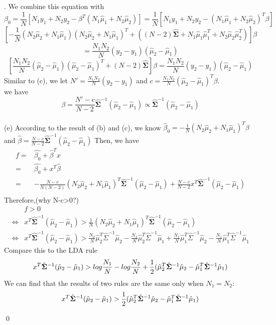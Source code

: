 \documentclass[12pt]{article}
\newenvironment{sol}
  {\par\vspace{3mm}\noindent{\it Solution}.}
  {\qed}
\begin{document}
\begin{sol}
We combine this equation with
$$\beta_0=\frac{1}{N}[N_1y_1+N_2y_2-\beta^T(N_1\hat{\mu}_1+N_2\hat{\mu}_2)]=\frac{1}{N}[N_1y_1+N_2y_2-(N_1\hat{\mu}_1+N_2\hat{\mu}_2)^T\beta]$$
$$\left[-\frac{1}{N}(N_2\hat{\mu}_2+N_1\hat{\mu}_1)(N_2\hat{\mu}_2+N_1\hat{\mu}_1)^T+((N-2)\hat{\mathbf{\Sigma}}+N_1\hat{\mu}_1\hat{\mu}_1^T+N_2\hat{\mu}_2\hat{\mu}_2^T)\right]\beta$$
$$=\frac{N_1N_2}{N}(y_2-y_1)(\hat{\mu}_2-\hat{\mu}_1)$$
$$\left[\frac{N_1N_2}{N}(\hat{\mu}_2-\hat{\mu}_1)(\hat{\mu}_2-\hat{\mu}_1)^T+(N-2)\hat{\mathbf{\Sigma}}\right]\beta=\frac{N_1N_2}{N}(y_2-y_1)(\hat{\mu}_2-\hat{\mu}_1)$$
Similar to (c), we let $N'=\frac{N_1N_2}{N}(y_2-y_1)$ and $c=\frac{N_1N_2}{N}(\hat{\mu}_2-\hat{\mu}_1)^T\beta$.\\
we have
$$\beta=\frac{N'-c}{N-2}\hat{\mathbf{\Sigma}}^{-1}(\hat{\mu}_2-\hat{\mu}_1)\propto\hat{\mathbf{\Sigma}}^{-1}(\hat{\mu}_2-\hat{\mu}_1)$$
\\
(e) According to the result of (b) and (c), we know $\hat{\beta}_0 = -\frac{1}{N}(N_2\hat{\mu}_2+N_1\hat{\mu}_1)^T\beta$ and $\hat{\beta}=\frac{N-c}{N-2}\hat{\mathbf{\Sigma}}^{-1}(\hat{\mu}_2-\hat{\mu}_1)$
Then, we have
\begin{equation*}
\begin{split}
f = &\hat{\beta_0}+\hat{\beta}^Tx\\
= &\hat{\beta_0}+x^T\hat{\beta}\\
= &-\frac{N-c}{N(N-2)}(N_2\hat{\mu}_2+N_1\hat{\mu}_1)^T\hat{\mathbf{\Sigma}}^{-1}(\hat{\mu}_2-\hat{\mu}_1)+\frac{N-c}{N-2}x^T\hat{\mathbf{\Sigma}}^{-1}(\hat{\mu}_2-\hat{\mu}_1)\\
\end{split}
\end{equation*}
Therefore,(why N-c>0?)
\begin{equation*}
\begin{split}
&f>0\\
\iff &x^T\hat{\mathbf{\Sigma}}^{-1}(\hat{\mu}_2-\hat{\mu}_1)>\frac{1}{N}(N_2\hat{\mu}_2+N_1\hat{\mu}_1)^T\hat{\mathbf{\Sigma}}^{-1}(\hat{\mu}_2-\hat{\mu}_1)\\
\iff &x^T\hat{\mathbf{\Sigma}}^{-1}(\hat{\mu}_2-\hat{\mu}_1)
>\frac{N_2}{N}\hat{\mu}_2^T\hat{\Sigma}^{-1}\hat{\mu}_2-\frac{N_2}{N}\hat{\mu}_2^T\hat{\Sigma}^{-1}\hat{\mu}_1+\frac{N_1}{N}\hat{\mu}_1^T\hat{\Sigma}^{-1}\hat{\mu}_2-\frac{N_1}{N}\hat{\mu}_1^T\hat{\Sigma}^{-1}\hat{\mu}_1
\end{split}
\end{equation*}
Compare this to the LDA rule
$$x^T\hat{\mathbf\Sigma}^{-1}(\hat{\mu}_2-\hat{\mu}_1)>log\frac{N_1}{N}-log\frac{N_2}{N}+\frac{1}{2}(\hat{\mu}_2^T\hat{\mathbf\Sigma}^{-1}\hat{\mu}_2-\hat{\mu}_1^T\hat{\mathbf\Sigma}^{-1}\hat{\mu}_1)\\$$
We can find that the results of two rules are the same only when $N_1=N_2$:
$$x^T\hat{\mathbf\Sigma}^{-1}(\hat{\mu}_2-\hat{\mu}_1)>\frac{1}{2}(\hat{\mu}_2^T\hat{\mathbf\Sigma}^{-1}\hat{\mu}_2-\hat{\mu}_1^T\hat{\mathbf\Sigma}^{-1}\hat{\mu}_1)\\$$

\end{sol}
\end{document}
